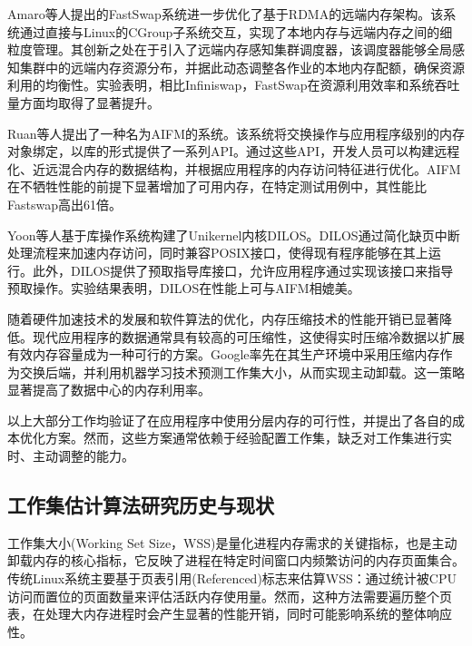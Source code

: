 Amaro等人提出的FastSwap系统进一步优化了基于RDMA的远端内存架构。该系统通过直接与Linux的CGroup子系统交互，实现了本地内存与远端内存之间的细粒度管理。其创新之处在于引入了远端内存感知集群调度器，该调度器能够全局感知集群中的远端内存资源分布，并据此动态调整各作业的本地内存配额，确保资源利用的均衡性。实验表明，相比Infiniswap，FastSwap在资源利用效率和系统吞吐量方面均取得了显著提升。

Ruan等人提出了一种名为AIFM的系统。该系统将交换操作与应用程序级别的内存对象绑定，以库的形式提供了一系列API。通过这些API，开发人员可以构建远程化、近远混合内存的数据结构，并根据应用程序的内存访问特征进行优化。AIFM在不牺牲性能的前提下显著增加了可用内存，在特定测试用例中，其性能比Fastswap高出61倍。

Yoon等人基于库操作系统构建了Unikernel内核DILOS。DILOS通过简化缺页中断处理流程来加速内存访问，同时兼容POSIX接口，使得现有程序能够在其上运行。此外，DILOS提供了预取指导库接口，允许应用程序通过实现该接口来指导预取操作。实验结果表明，DILOS在性能上可与AIFM相媲美。

随着硬件加速技术的发展和软件算法的优化，内存压缩技术的性能开销已显著降低。现代应用程序的数据通常具有较高的可压缩性，这使得实时压缩冷数据以扩展有效内存容量成为一种可行的方案。Google率先在其生产环境中采用压缩内存作为交换后端，并利用机器学习技术预测工作集大小，从而实现主动卸载。这一策略显著提高了数据中心的内存利用率。

以上大部分工作均验证了在应用程序中使用分层内存的可行性，并提出了各自的成本优化方案。然而，这些方案通常依赖于经验配置工作集，缺乏对工作集进行实时、主动调整的能力。

\subsection{工作集估计算法研究历史与现状}
\label{sec:工作集估计算法研究历史与现状}

工作集大小(Working Set Size，WSS)是量化进程内存需求的关键指标，也是主动卸载内存的核心指标，它反映了进程在特定时间窗口内频繁访问的内存页面集合。传统Linux系统主要基于页表引用(Referenced)标志来估算WSS：通过统计被CPU访问而置位的页面数量来评估活跃内存使用量。然而，这种方法需要遍历整个页表，在处理大内存进程时会产生显著的性能开销，同时可能影响系统的整体响应性。

